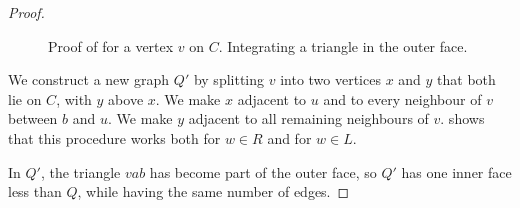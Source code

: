 \begin{proof}
  \begin{figure}
     \caption{Proof of  for a vertex
       $v$ on $C$. Integrating a triangle in the outer face.}
   \end{figure}


 We construct a new graph $Q'$ by splitting $v$ into two vertices $x$
 and $y$ that both lie on $C$, with $y$ above $x$.
 We make $x$ adjacent to $u$ and to every neighbour of
 $v$ between $b$ and $u$.
 We make
 $y$ adjacent to all remaining neighbours of $v$.
 shows that this procedure works both for $w\in R$
and for $w\in L$.
 
   In $Q'$, the triangle $vab$ has become part of the outer face, so $Q'$ has one inner
   face less than $Q$, while having the same number of edges.
   

\end{proof}
